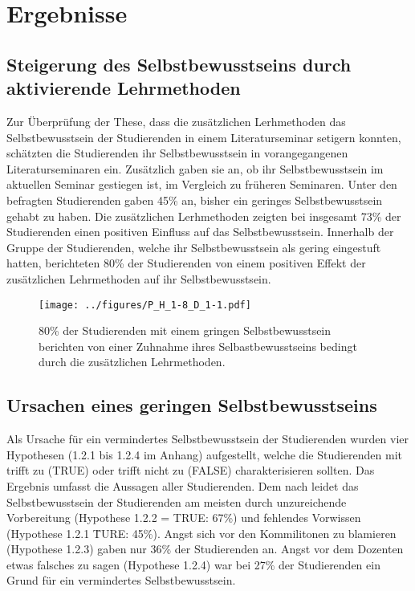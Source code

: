 \section{Ergebnisse}

\subsection{Steigerung des Selbstbewusstseins durch aktivierende Lehrmethoden}
Zur Überprüfung der These, dass die zusätzlichen Lerhmethoden das Selbstbewusstsein der Studierenden in einem Literaturseminar setigern konnten, schätzten die Studierenden ihr Selbstbewusstsein in vorangegangenen Literaturseminaren ein. Zusätzlich gaben sie an, ob ihr Selbstbewusstsein im aktuellen Seminar gestiegen ist, im Vergleich zu früheren Seminaren. Unter den befragten Studierenden gaben 45\% an, bisher ein geringes Selbstbewusstsein gehabt zu haben. Die zusätzlichen Lerhmethoden zeigten bei insgesamt 73\% der Studierenden einen positiven Einfluss auf das Selbstbewusstsein. Innerhalb der Gruppe der Studierenden, welche ihr Selbstbewusstsein als gering eingestuft hatten, berichteten 80\% der Studierenden von einem positiven Effekt der zusätzlichen Lehrmethoden auf ihr Selbstbewusstsein.

\begin{figure}[h!]
\begin{center}
	\texttt{[image: ../figures/P\_H\_1-8\_D\_1-1.pdf]}
\end{center}
	\caption{ 80\% der Studierenden mit einem gringen Selbstbewusstsein berichten von einer Zuhnahme ihres Selbastbewusstseins bedingt durch die zusätzlichen Lehrmethoden.}
\end{figure}

\subsection{Ursachen eines geringen Selbstbewusstseins}
Als Ursache für ein vermindertes Selbstbewusstsein der Studierenden wurden vier Hypothesen (1.2.1 bis 1.2.4 im Anhang) aufgestellt, welche die Studierenden mit trifft zu (TRUE) oder trifft nicht zu (FALSE) charakterisieren sollten. Das Ergebnis umfasst die Aussagen aller Studierenden. Dem nach leidet das Selbstbewusstsein der Studierenden am meisten durch unzureichende Vorbereitung (Hypothese 1.2.2 = TRUE: 67\%) und fehlendes Vorwissen (Hypothese 1.2.1 \= TURE: 45\%). Angst sich vor den Kommilitonen zu blamieren (Hypothese 1.2.3) gaben nur 36\% der Studierenden an. Angst vor dem Dozenten etwas falsches zu sagen (Hypothese 1.2.4) war bei 27\% der Studierenden ein Grund für ein vermindertes Selbstbewusstsein.   

